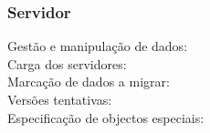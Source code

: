 \subsubsection{Servidor}

\begin{description}

\item[Gestão e manipulação de dados:]

\item[Carga dos servidores:]

\item[Marcação de dados a migrar:]

\item[Versões tentativas:]

\item[Especificação de objectos especiais:]

\end{description}